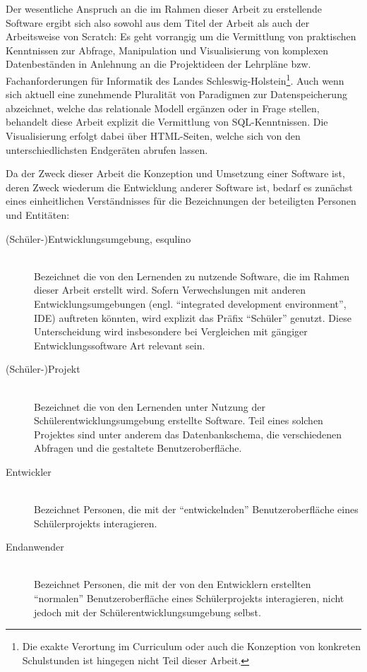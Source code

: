 Der wesentliche Anspruch an die im Rahmen dieser Arbeit zu erstellende Software ergibt sich also sowohl aus dem Titel der Arbeit als auch der Arbeitsweise von Scratch: Es geht vorrangig um die Vermittlung von praktischen Kenntnissen zur Abfrage, Manipulation und Visualisierung von komplexen Datenbeständen in Anlehnung an die Projektideen der Lehrpläne \cite{lehrplan-inf-sek-1} bzw. Fachanforderungen \cite{lehrplan-inf-sek-2} für Informatik des Landes Schleswig-Holstein\footnote{Die exakte Verortung im Curriculum oder auch die Konzeption von konkreten Schulstunden ist hingegen nicht Teil dieser Arbeit.}. Auch wenn sich aktuell eine zunehmende Pluralität von Paradigmen zur Datenspeicherung abzeichnet, welche das relationale Modell ergänzen oder in Frage stellen, behandelt diese Arbeit explizit die Vermittlung von SQL-Kenntnissen. Die Visualisierung erfolgt dabei über HTML-Seiten, welche sich von den unterschiedlichsten Endgeräten abrufen lassen.

Da der Zweck dieser Arbeit die Konzeption und Umsetzung einer Software ist, deren Zweck wiederum die Entwicklung anderer Software ist, bedarf es zunächst eines einheitlichen Verständnisses für die Bezeichnungen der beteiligten Personen und Entitäten:

\begin{description}
\item[(Schüler-)Entwicklungsumgebung, esqulino] \hfill\\ 
  Bezeichnet die von den Lernenden zu nutzende Software, die im Rahmen dieser Arbeit erstellt wird. Sofern Verwechslungen mit anderen Entwicklungsumgebungen (engl. ``integrated development environment'', IDE) auftreten könnten, wird explizit das Präfix ``Schüler'' genutzt. Diese Unterscheidung wird insbesondere bei Vergleichen mit gängiger Entwicklungssoftware Art relevant sein.
\item[(Schüler-)Projekt] \hfill\\
  Bezeichnet die von den Lernenden unter Nutzung der Schülerentwicklungsumgebung erstellte Software. Teil eines solchen Projektes sind unter anderem das Datenbankschema, die verschiedenen Abfragen und die gestaltete Benutzeroberfläche.
\item[Entwickler] \hfill\\
  Bezeichnet Personen, die mit der ``entwickelnden'' Benutzeroberfläche eines Schülerprojekts interagieren.
\item[Endanwender] \hfill\\
  Bezeichnet Personen, die mit der von den Entwicklern erstellten ``normalen'' Benutzeroberfläche eines Schülerprojekts interagieren, nicht jedoch mit der Schülerentwicklungsumgebung selbst.
\end{description}
